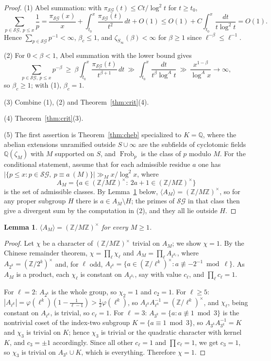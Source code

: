 \documentclass[11pt]{amsart}
\numberwithin{equation}{section}
\newtheorem{lemma}[theorem]{Lemma}
\theoremstyle{definition}
\theoremstyle{remark}
\newcommand{\Z}{\mathbb{Z}}
\newcommand{\Q}{\mathbb{Q}}
\newcommand{\Frob}{\operatorname{Frob}}
\newcommand{\SG}{\mathcal{SG}}
\begin{document}
\begin{proof}
(1) Abel summation: with $\pi_\SG(t)\le Ct/\log^2t$ for $t\ge t_0$,
\[
\sum_{p\in\SG,\ p\le x}\frac1p=\frac{\pi_\SG(x)}{x}+\int_{t_0}^x\frac{\pi_\SG(t)}{t^2}\,dt+O(1)
\le O(1)+C\int_{t_0}^x\frac{dt}{t\log^2t}=O(1).
\]
Hence $\sum_{p\in\SG}p^{-1}<\infty$, $\beta_c\le1$, and
$\zeta_{S_\infty}(\beta)<\infty$ for $\beta\ge1$ since $\ell^{-\beta}\le\ell^{-1}$.

(2) For $0<\beta<1$, Abel summation with the lower bound gives
\[
\sum_{p\in\SG,\ p\le x}p^{-\beta}\ \ge\ \beta\int_{t_0}^x\frac{\pi_\SG(t)}{t^{\beta+1}}\,dt
\ \gg\ \int_{t_0}^x\frac{dt}{t^{\beta}\log^At}\ \gg\ \frac{x^{1-\beta}}{\log^Ax}\longrightarrow\infty,
\]
so $\beta_c\ge1$; with (1), $\beta_c=1$.

(3) Combine (1), (2) and Theorem~\ref{thm:crit}(4).

(4) Theorem~\ref{thm:crit}(3).

(5) The first assertion is Theorem~\ref{thm:cheb} specialized to $K=\Q$, where
the abelian extensions unramified outside $S\cup\infty$ are the subfields of
cyclotomic fields $\Q(\zeta_M)$ with $M$ supported on $S$, and $\Frob_p$ is the
class of $p$ modulo $M$. For the conditional statement, assume that for each
admissible residue $a$ one has
$|\{p\le x:p\in\SG,\ p\equiv a\ (M)\}|\gg_Mx/\log^2x$, where
\[
A_M=\{a\in(\Z/M\Z)^\times:\ 2a+1\in(\Z/M\Z)^\times\}
\]
is the set of admissible classes. By Lemma~\ref{lem:admissible} below,
$\langle A_M\rangle=(\Z/M\Z)^\times$, so for any proper subgroup $H$ there is
$a\in A_M\setminus H$; the primes of $\SG$ in that class then give a divergent
sum by the computation in (2), and they all lie outside $H$.
\end{proof}

\begin{lemma}\label{lem:admissible}
$\langle A_M\rangle=(\Z/M\Z)^\times$ for every $M\ge1$.
\end{lemma}

\begin{proof}
Let $\chi$ be a character of $(\Z/M\Z)^\times$ trivial on $A_M$; we show
$\chi=1$. By the Chinese remainder theorem, $\chi=\prod_\ell\chi_\ell$ and
$A_M=\prod_\ell A_{\ell^{k_\ell}}$, where $A_{2^k}=(\Z/2^k)^\times$ and, for
$\ell$ odd, $A_{\ell^k}=\{a\in(\Z/\ell^k)^\times:a\not\equiv-2^{-1}\bmod\ell\}$.
As $A_M$ is a product, each $\chi_\ell$ is constant on $A_{\ell^{k_\ell}}$, say
with value $c_\ell$, and $\prod_\ell c_\ell=1$.

For $\ell=2$: $A_{2^k}$ is the whole group, so $\chi_2=1$ and $c_2=1$. For
$\ell\ge5$: $|A_{\ell^k}|=\varphi(\ell^k)(1-\frac{1}{\ell-1})>\frac12\varphi(\ell^k)$,
so $A_{\ell^k}A_{\ell^k}^{-1}=(\Z/\ell^k)^\times$, and $\chi_\ell$, being
constant on $A_{\ell^k}$, is trivial, so $c_\ell=1$. For $\ell=3$:
$A_{3^k}=\{a:a\not\equiv1\bmod3\}$ is the nontrivial coset of the index-two
subgroup $K=\{a\equiv1\bmod3\}$, so $A_{3^k}A_{3^k}^{-1}=K$ and $\chi_3$ is
trivial on $K$; hence $\chi_3$ is trivial or the quadratic character with
kernel $K$, and $c_3=\pm1$ accordingly. Since all other $c_\ell=1$ and
$\prod c_\ell=1$, we get $c_3=1$, so $\chi_3$ is trivial on $A_{3^k}\cup K$,
which is everything. Therefore $\chi=1$.
\end{proof}
\end{document}
